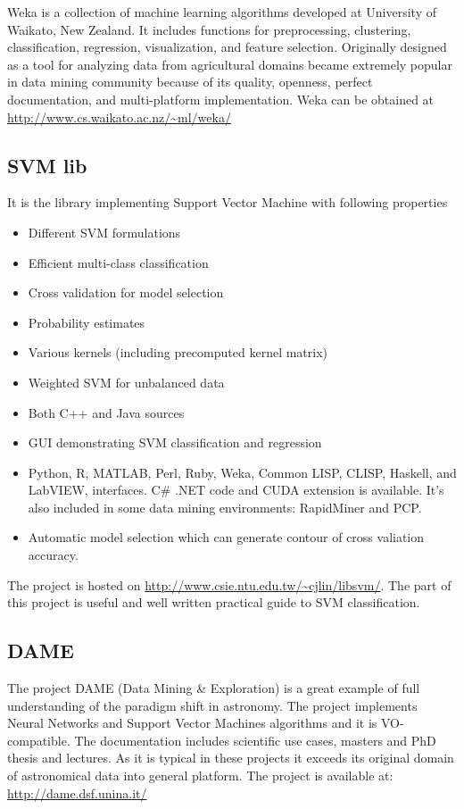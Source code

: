 Weka is a collection of machine learning algorithms developed at
University of Waikato, New Zealand. It includes functions for
preprocessing, clustering, classification, regression, visualization,
and feature selection. Originally designed as a tool for analyzing
data from agricultural domains became extremely popular in data mining
community because of its quality, openness, perfect documentation, and
multi-platform implementation. Weka can be obtained at
\url{http://www.cs.waikato.ac.nz/~ml/weka/}



\subsection{SVM lib}
It is the library implementing Support Vector Machine with following properties
\begin{itemize}
    \item Different SVM formulations
    \item Efficient multi-class classification
    \item Cross validation for model selection
    \item Probability estimates
    \item Various kernels (including precomputed kernel matrix)
    \item Weighted SVM for unbalanced data
    \item Both C++ and Java sources
    \item GUI demonstrating SVM classification and regression
    \item Python, R, MATLAB, Perl, Ruby, Weka, Common LISP, CLISP,
      Haskell, and LabVIEW, interfaces. C\# .NET code and CUDA
      extension is available.  It's also included in some data mining
      environments: RapidMiner and PCP.
    \item Automatic model selection which can generate contour of
      cross valiation accuracy.
\end{itemize}

The project is hosted on
\url{http://www.csie.ntu.edu.tw/~cjlin/libsvm/}.  The part of this
project is useful and well written practical guide to SVM
classification.

\subsection{DAME}
The project DAME (Data Mining \& Exploration) is a great example of
full understanding of the paradigm shift in astronomy. The project
implements Neural Networks and Support Vector Machines algorithms and
it is VO-compatible. The documentation includes scientific use cases,
masters and PhD thesis and lectures. As it is typical in these
projects it exceeds its original domain of astronomical data into
general platform. The project is available at:
\url{http://dame.dsf.unina.it/}

